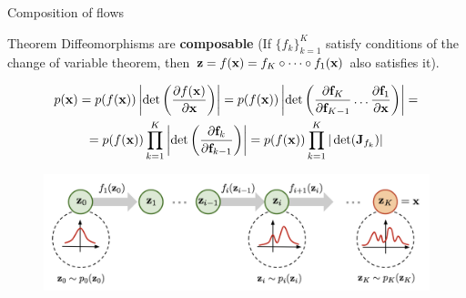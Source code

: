 \begin{frame}{Composition of flows}
	\begin{block}{Theorem}
		Diffeomorphisms are \textbf{composable} (If $\{f_k\}_{k=1}^K$ satisfy conditions of the change of variable theorem, then $\mathbf{z} = f(\mathbf{x}) = f_K \circ \dots \circ f_1(\mathbf{x})$ also satisfies it).
	\end{block}
	\vspace{-0.5cm}
	{ \footnotesize
		\begin{multline*}
			p(\mathbf{x}) = p(f(\mathbf{x})) \left|\det \left(\frac{\partial f(\mathbf{x})}{\partial \mathbf{x}} \right) \right| =
			p(f(\mathbf{x})) \left|\det \left(\frac{\partial \textbf{f}_K}{\partial \textbf{f}_{K-1}} \dots \frac{\partial \textbf{f}_1}{\partial \mathbf{x}} \right) \right| = \\ = p(f(\mathbf{x})) \prod_{k=1}^K \left|\det \left(\frac{\partial \textbf{f}_{k}}{\partial \textbf{f}_{k-1}} \right) \right|
			= p(f(\mathbf{x})) \prod_{k=1}^K |\det ( \mathbf{J}_{f_k}) |
		\end{multline*}
	}
	\vspace{-0.3cm}
	\begin{figure}
		\includegraphics[width=0.95\linewidth]{figs/normalizing-flow}
	\end{figure}
\end{frame}
